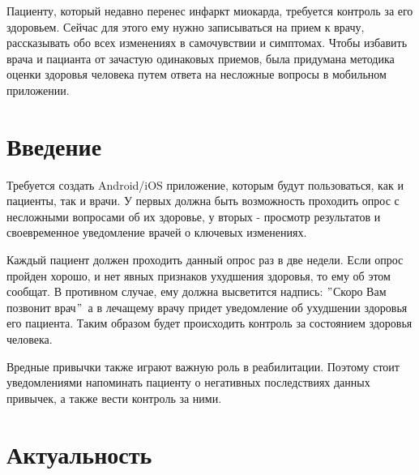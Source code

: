 \documentclass[a4paper,12pt]{article}
\begin{document}
		Пациенту, который недавно перенес инфаркт миокарда, требуется контроль за его здоровьем.
		Сейчас для этого ему нужно записываться на прием к врачу, рассказывать обо всех изменениях в самочувствии и симптомах. Чтобы избавить врача и пацианта от зачастую одинаковых приемов, была придумана методика оценки здоровья человека путем ответа на несложные вопросы в мобильном приложении.

	\newpage

	\section{Введение}
		Требуется создать Android/iOS приложение, которым будут пользоваться, как и пациенты, так и врачи.
		У первых должна быть возможность проходить опрос с несложными вопросами об их здоровье, у вторых - просмотр результатов и своевременное уведомление врачей о ключевых изменениях.  \par
		Каждый пациент должен проходить данный опрос раз в две недели.
		Если опрос пройден хорошо, и нет явных признаков ухудшения здоровья, то ему об этом сообщат.
		В противном случае, ему должна высветится надпись: \("\)Скоро Вам позвонит врач\("\)\, а в лечащему врачу придет уведомление об ухудшении здоровья его пациента. Таким образом будет происходить контроль за состоянием здоровья человека. \par
		Вредные привычки также играют важную роль в реабилитации.
		Поэтому стоит уведомлениями напоминать пациенту о негативных последствиях данных привычек, а также вести контроль за ними.

	\newpage

	\section{Актуальность}\label{sec:}
\end{document}
